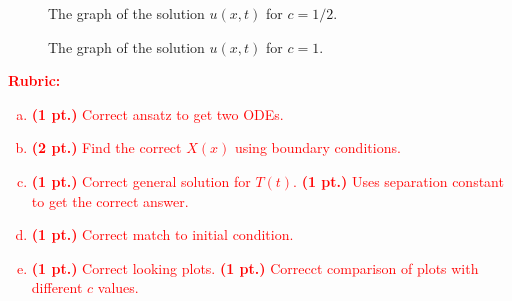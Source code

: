 \documentclass[12pt]{article} %
\begin{document}
\begin{solution}
\begin{enumerate}[(a)]
                \begin{figure}[H]
                	\centering
                	\def\svgwidth{0.6\columnwidth}
                	
                    \caption{The graph of the solution $u(x,t)$ for $c=1/2$.}
                \end{figure}
                \begin{figure}[H]
                                	\centering
                                	\def\svgwidth{0.6\columnwidth}
                                	
                                    \caption{The graph of the solution $u(x,t)$ for $c=1$.}
                                \end{figure}
\end{enumerate}
\end{solution}

\textcolor{red}{
\noindent \textbf{Rubric:}
\begin{enumerate}[(a)]
    \item \textbf{(1 pt.)} Correct ansatz to get two ODEs.
	\item \textbf{(2 pt.)} Find the correct $X(x)$ using boundary conditions.
	\item \textbf{(1 pt.)} Correct general solution for $T(t)$. \textbf{(1 pt.)} Uses separation constant to get the correct answer.
	\item \textbf{(1 pt.)} Correct match to initial condition.
	\item \textbf{(1 pt.)} Correct looking plots. \textbf{(1 pt.)} Correcct comparison of plots with different $c$ values.
\end{enumerate}
}


\newpage
\end{document}
